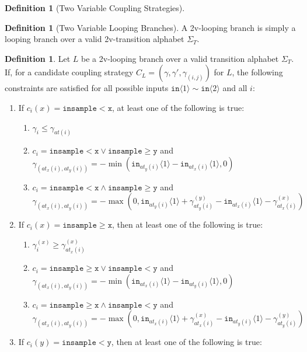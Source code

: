 \documentclass[12pt]{article}
\newcommand{\gguard}[1][x]{\texttt{insample}\geq #1}
\newcommand{\lguard}[1][x]{\texttt{insample} < #1}
\newcommand{\brangle}[1]{\langle #1 \rangle}
\theoremstyle{definition}
\newtheorem{defn}[thm]{Definition}
\begin{document}
\begin{defn}[Two Variable Coupling Strategies]
    
\end{defn}

\begin{defn}[Two Variable Looping Branches]
    A 2v-looping branch is simply a looping branch over a valid 2v-transition alphabet $\Sigma_T$.
\end{defn}

\begin{defn}
    Let $L$ be a 2v-looping branch over a valid transition alphabet $\Sigma_T$. If, for a candidate coupling strategy $C_L = (\gamma, \gamma', \gamma_{(i, j)})$ for $L$, the following constraints are satisfied for all possible inputs $\texttt{in}\brangle{1}\sim\texttt{in}\brangle{2}$ and all $i$: \begin{enumerate}
        \item If $c_i(x) = \lguard[\texttt{x}]$, at least one of the following is true:\begin{enumerate}
            \item $\gamma_i\leq\gamma_{at(i)}$
            \item $c_i = \lguard[\texttt{x}]\lor\gguard[\texttt{y}]$ and $\gamma_{(at_x(i), at_y(i))} = -\min(\texttt{in}_{at_y(i)}\brangle{1}-\texttt{in}_{at_x(i)}\brangle{1}, 0)$
            \item $c_i = \lguard[\texttt{x}]\land\gguard[\texttt{y}]$ and $\gamma_{(at_x(i), at_y(i))} = -\max(0, \texttt{in}_{at_y(i)}\brangle{1}+ \gamma_{at_y(i)}^{(y)}-\texttt{in}_{at_x(i)}\brangle{1}-\gamma_{at_x(i)}^{(x)})$
        \end{enumerate}
        \item If $c_i(x) = \gguard[\texttt{x}]$, then at least one of the following is true: \begin{enumerate}
            \item $\gamma_i^{(x)}\geq \gamma^{(x)}_{at_x(i)}$
            \item $c_i = \gguard[\texttt{x}]\lor\lguard[\texttt{y}]$ and $\gamma_{(at_x(i), at_y(i))} = -\min(\texttt{in}_{at_x(i)}\brangle{1}-\texttt{in}_{at_y(i)}\brangle{1}, 0)$
            \item $c_i = \gguard[\texttt{x}]\land\lguard[\texttt{y}]$ and $\gamma_{(at_x(i), at_y(i))} = -\max(0, \texttt{in}_{at_x(i)}\brangle{1}+ \gamma_{at_x(i)}^{(x)}-\texttt{in}_{at_y(i)}\brangle{1}-\gamma_{at_y(i)}^{(y)})$
        \end{enumerate}
        \item If $c_i(y) = \lguard[\texttt{y}]$, then at least one of the following is true: \begin{enumerate}

\end{enumerate}
\end{enumerate}
\end{defn}
\end{document}
